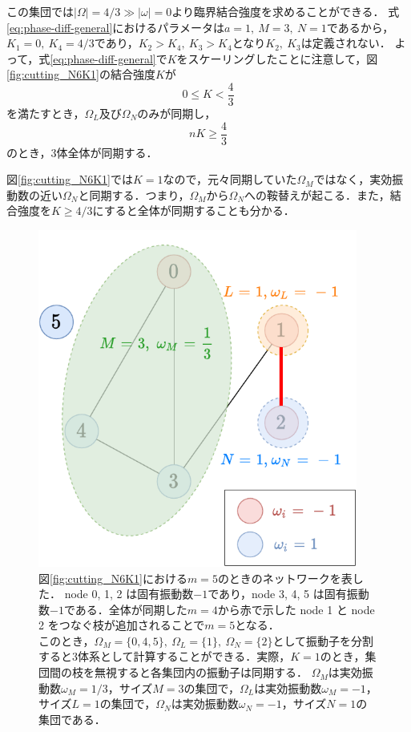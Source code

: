 \documentclass[../main]{subfiles}
\begin{document}
この集団では$|\Omega|=4/3\gg|\omega|=0$より臨界結合強度を求めることができる．
式\eqref{eq:phase-diff-general}におけるパラメータは$a=1,\ M=3,\ N=1$であるから，
$K_1=0,\ K_4=4/3$であり，$K_2>K_4,\ K_3>K_4$となり$K_2,\ K_3$は定義されない．
よって，式\eqref{eq:phase-diff-general}で$K$をスケーリングしたことに注意して，図\ref{fig:cutting_N6K1}の結合強度$K$が
\begin{equation*}
    0\leq K<\frac{4}{3}
\end{equation*}
を満たすとき，$\Omega_L$及び$\Omega_N$のみが同期し，
\begin{equation*}
    nK\geq \frac{4}{3}
\end{equation*}
のとき，3体全体が同期する．

図\ref{fig:cutting_N6K1}では$K=1$なので，元々同期していた$\Omega_M$ではなく，実効振動数の近い$\Omega_N$と同期する．つまり，$\Omega_M$から$\Omega_N$への鞍替えが起こる．また，結合強度を$K\geq 4/3$にすると全体が同期することも分かる．

\begin{figure}[tbp]
\centering
\includegraphics[width=105mm]{images/cutting_N6_drawio.pdf}
\centering
\caption{図\ref{fig:cutting_N6K1}における$m=5$のときのネットワークを表した．
node 0, 1, 2 は固有振動数$-1$であり，node 3, 4, 5 は固有振動数$-1$である．全体が同期した$m=4$から赤で示した node 1 と node 2 をつなぐ枝が追加されることで$m=5$となる．\\
このとき，$\Omega_M=\{0,4,5\},\ \Omega_L=\{1\},\ \Omega_N=\{2\}$として振動子を分割すると3体系として計算することができる．実際，$K=1$のとき，集団間の枝を無視すると各集団内の振動子は同期する．
$\Omega_M$は実効振動数$\omega_M=1/3$，サイズ$M=3$の集団で，$\Omega_L$は実効振動数$\omega_M=-1$，サイズ$L=1$の集団で，$\Omega_N$は実効振動数$\omega_N=-1$，サイズ$N=1$の集団である．}
\label{fig:cutting_N6-m5}
\end{figure}
\end{document}
